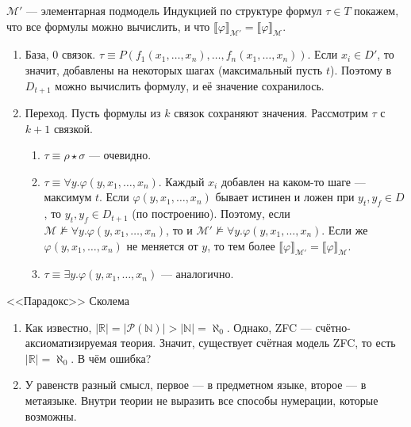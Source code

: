 \documentclass[aspectratio=169]{beamer}
\begin{document}
\begin{frame}{$\mathcal{M}'$ --- элементарная подмодель}
Индукцией по структуре формул $\tau \in T$ покажем, 
что все формулы можно вычислить, и что $\llbracket \varphi \rrbracket_\mathcal{M'} = \llbracket \varphi \rrbracket_\mathcal{M}$.\pause

\begin{enumerate}
\item База, 0 связок. $\tau \equiv P(f_1(x_1,\dots,x_n),\dots,f_n(x_1,\dots,x_n))$. \pause Если $x_i \in D'$, то значит,
добавлены на некоторых шагах (максимальный пусть $t$). Поэтому в $D_{t+1}$ можно вычислить формулу, и её значение сохранилось. \pause
\item Переход. Пусть формулы из $k$ связок сохраняют значения. Рассмотрим $\tau$ с $k+1$ связкой. \pause
\begin{enumerate}
\item $\tau \equiv \rho \star \sigma$ --- очевидно. \pause
\item $\tau\equiv\forall y.\varphi(y,x_1,\dots,x_n)$. \pause 
Каждый $x_i$ добавлен на каком-то шаге --- максимум $t$. \pause 
Если $\varphi(y,x_1,\dots,x_n)$ бывает истинен и ложен при $y_t, y_f \in D$, то $y_t, y_f \in D_{t+1}$ (по построению). \pause
Поэтому, если $\mathcal{M}\not\models\forall y.\varphi(y,x_1,\dots,x_n)$, то и 
$\mathcal{M'}\not\models\forall y.\varphi(y,x_1,\dots,x_n)$. \pause
Если же $\varphi(y,x_1,\dots,x_n)$ не меняется от $y$, то тем более
$\llbracket \varphi \rrbracket_\mathcal{M'} = \llbracket \varphi \rrbracket_\mathcal{M}$. \pause
\item $\tau\equiv\exists y.\varphi(y,x_1,\dots,x_n)$ --- аналогично.
\end{enumerate}
\end{enumerate}
\end{frame}

\begin{frame}{<<Парадокс>> Сколема}
\begin{enumerate}
\item Как известно, $|\mathbb{R}| = |\mathcal{P}(\mathbb{N})| > |\mathbb{N}| = \aleph_0$. \pause Однако, ZFC --- счётно-аксиоматизируемая теория. \pause
Значит, существует счётная модель ZFC, то есть $|\mathbb{R}| = \aleph_0$. \pause В чём ошибка? \pause
\item У равенств разный смысл, первое --- в предметном языке, второе --- в метаязыке. \pause Внутри теории не выразить все 
способы нумерации, которые возможны.
\end{enumerate}
\end{frame}
\end{document}
